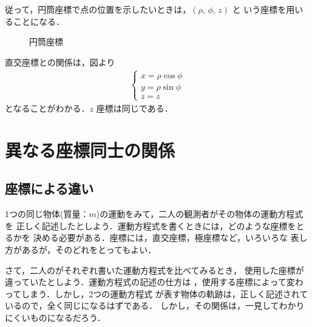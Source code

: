             従って，円筒座標で点の位置を示したいときは，$(\rho,\,\phi,\,z)$ と
            いう座標を用いることになる．
                \begin{figure}[hbt]
                    \begin{center}
                        \caption{円筒座標}
                        \label{fig:entou}
                    \end{center}
                \end{figure}


            直交座標との関係は，図より
                    \begin{align}
                            \begin{cases}\label{entou_chokkou}
                                x=\rho\cos\phi \\
                                y=\rho\sin\phi \\
                                z=z
                            \end{cases}
                    \end{align}
            となることがわかる．$z$ 座標は同じである．


\section{異なる座標同士の関係}
\subsection{座標による違い}
                1つの同じ物体(質量：$m$)の運動をみて，二人の観測者がその物体の運動方程式を
                正しく記述したとしよう．運動方程式を書くときには，どのような座標をとるかを
                決める必要がある．座標には，直交座標，極座標など，いろいろな
                表し方があるが，そのどれをとってもよい．

                さて，二人のがそれぞれ書いた運動方程式を比べてみるとき，
                使用した座標が違っていたとしよう．運動方程式の記述の仕方は
                ，使用する座標によって変わってしまう．しかし，2つの運動方程式
                が表す物体の軌跡は，正しく記述されているので，全く同じになるはずである．
                しかし，その関係は，一見してわかりにくいものになるだろう．

